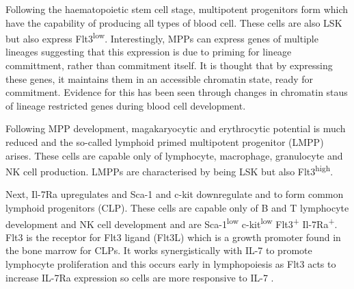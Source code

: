 Following the haematopoietic stem cell stage, multipotent progenitors form which have the capability of producing all types of blood cell.
These cells are also LSK but also express Flt3\textsuperscript{low}\citep{Welinder2011}.
Interestingly, MPPs can express genes of multiple lineages \citep{Hu1997} suggesting that this expression is due to priming for lineage committment, rather than commitment itself.
It is thought that by expressing these genes, it maintains them in an accessible chromatin state, ready for commitment\citep{Welinder2011}.
Evidence for this has been seen through changes in chromatin staus of lineage restricted genes during blood cell development\citep{Weishaupt2010}.

Following MPP development, magakaryocytic and erythrocytic potential is much reduced and the so-called lymphoid primed multipotent progenitor (LMPP) arises.
These cells are capable only of lymphocyte, macrophage, granulocyte and NK cell production\citep{Adolfsson2005}.
LMPPs are characterised by being LSK but also Flt3\textsuperscript{high}.

Next, Il-7Ra upregulates and Sca-1 and c-kit downregulate and to form common lymphoid progenitors (CLP).
These cells are capable only of B and T lymphocyte development and NK cell development \citep{Kondo1997} and are Sca-1\textsuperscript{low} c-kit\textsuperscript{low} Flt3\textsuperscript{+} Il-7Ra\textsuperscript{+}.
Flt3 is the receptor for Flt3 ligand (Flt3L) which is a growth promoter found in the bone marrow for CLPs.
It works synergistically with IL-7 to promote lymphocyte proliferation and this occurs early in lymphopoiesis as Flt3 acts to increase IL-7Ra expression so cells are more responsive to IL-7 \citep{Holmes2006}.

